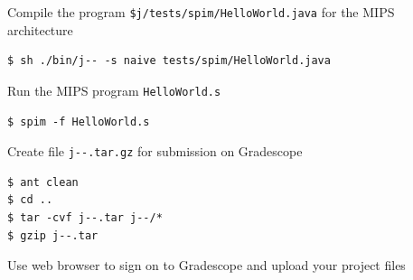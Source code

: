 \documentclass[8pt,a4paper,compress]{beamer}
\newlength{\myMheight}
\begin{document}
\begin{frame}[fragile]
\pause\transdissolve

Compile the \jmm program \lstinline{$j/tests/spim/HelloWorld.java} for the MIPS architecture

\begin{tcolorbox}[enhanced,drop shadow southwest,sharp corners,size=fbox,colback=black]
\begin{lstlisting}[style=terminal]
$ sh ./bin/j-- -s naive tests/spim/HelloWorld.java
\end{lstlisting}
\end{tcolorbox}

\pause\transdissolve\bigskip

Run the MIPS program \lstinline{HelloWorld.s}

\begin{tcolorbox}[enhanced,drop shadow southwest,sharp corners,size=fbox,colback=black]
\begin{lstlisting}[style=terminal]
$ spim -f HelloWorld.s
\end{lstlisting}
\end{tcolorbox}

\pause\transdissolve\bigskip

Create file \lstinline{j--.tar.gz} for submission on Gradescope

\begin{tcolorbox}[enhanced,drop shadow southwest,sharp corners,size=fbox,colback=black]
\begin{lstlisting}[style=terminal]
$ ant clean
$ cd ..
$ tar -cvf j--.tar j--/*
$ gzip j--.tar
\end{lstlisting}
\end{tcolorbox}

\pause\transdissolve\bigskip

Use web browser  to sign on to Gradescope and upload your project files
\end{frame}
\end{document}
